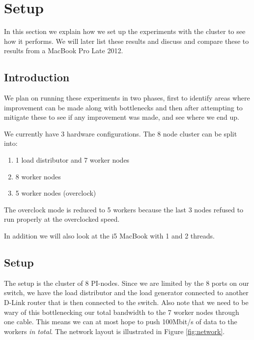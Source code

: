 \clearpage

\section{Setup}
\label{sec:setup}

In this section we explain how we set up the experiments with the cluster to see how it performs. We will later list these results and discuss and compare these to results from a MacBook Pro Late 2012.

\subsection{Introduction}
We plan on running these experiments in two phases, first to identify areas where improvement can be made along with bottlenecks and then after attempting to mitigate these to see if any improvement was made, and see where we end up.

We currently have 3 hardware configurations. The 8 node cluster can be split into:

\begin{enumerate}
\item 1 load distributor and 7 worker nodes
\item 8 worker nodes
\item 5 worker nodes (overclock)
\end{enumerate}

The overclock mode is reduced to 5 workers because the last 3 nodes refused to run properly at the overclocked speed.

In addition we will also look at the i5 MacBook with 1 and 2 threads.

\subsection{Setup}
The setup is the cluster of 8 PI-nodes. Since we are limited by the 8 ports on our switch, we have the load distributor and the load generator connected to another D-Link router that is then connected to the switch.
Also note that we need to be wary of this bottlenecking our total bandwidth to the 7 worker nodes through one cable.
This means we can at most hope to push 100Mbit/s of data to the workers {\em in total}.
The network layout is illustrated in Figure \ref{fig:network}.

